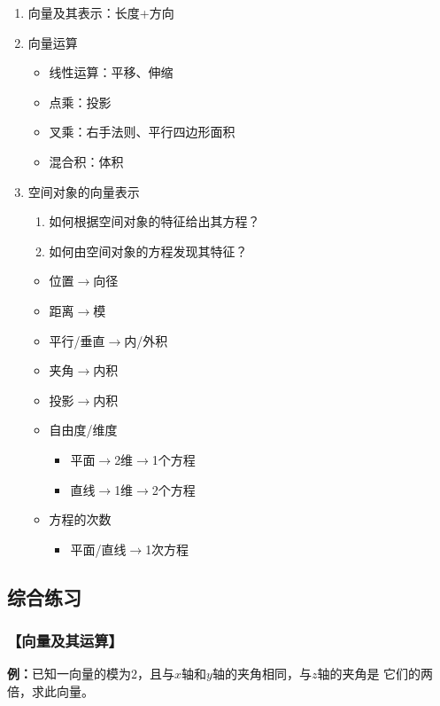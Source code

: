 \begin{enumerate}
  \item 向量及其表示：长度+方向
  \item 向量运算
  \begin{itemize}
    \item 线性运算：平移、伸缩
    \item 点乘：投影
    \item 叉乘：右手法则、平行四边形面积
    \item 混合积：体积
  \end{itemize}
  \item 空间对象的向量表示
  \begin{enumerate}
	\item 如何根据空间对象的特征给出其方程？ 
	\item 如何由空间对象的方程发现其特征？ 
  \end{enumerate}
  \begin{itemize}
	\item 位置$\to$向径 
	\item 距离$\to$模 
	\item 平行/垂直$\to$内/外积 
	\item 夹角$\to$内积 
	\item 投影$\to$内积 
	\item 自由度/维度 
    \begin{itemize}
      \item 平面$\to$2维$\to$1个方程
      \item 直线$\to$1维$\to$2个方程
    \end{itemize}
    \item 方程的次数
    \begin{itemize}
      \item 平面/直线$\to$1次方程
    \end{itemize}
  \end{itemize}
\end{enumerate}

\subsection{综合练习}

\subsubsection{【向量及其运算】}

{\bf 例：}已知一向量的模为$2$，且与$x$轴和$y$轴的夹角相同，与$z$轴的夹角是
它们的两倍，求此向量。


